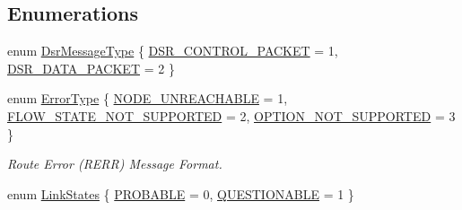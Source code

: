 \subsection*{Enumerations}
\begin{DoxyCompactItemize}
\item 
enum \hyperlink{namespacens3_1_1dsr_a7c80bcec67d78dc149a0e503014d07c5}{Dsr\+Message\+Type} \{ \hyperlink{namespacens3_1_1dsr_a7c80bcec67d78dc149a0e503014d07c5abeaa53bf31d961c221e4e377ef6022f2}{D\+S\+R\+\_\+\+C\+O\+N\+T\+R\+O\+L\+\_\+\+P\+A\+C\+K\+ET} = 1, 
\hyperlink{namespacens3_1_1dsr_a7c80bcec67d78dc149a0e503014d07c5ad29c69f5a6ad5fbb5eec5524f553e315}{D\+S\+R\+\_\+\+D\+A\+T\+A\+\_\+\+P\+A\+C\+K\+ET} = 2
 \}
\item 
enum \hyperlink{group__dsr_ga40f62a50dc031f2853e92211aad095f4}{Error\+Type} \{ \hyperlink{group__dsr_gga40f62a50dc031f2853e92211aad095f4adf3df5290f2b4d470e5ea842c44b32e5}{N\+O\+D\+E\+\_\+\+U\+N\+R\+E\+A\+C\+H\+A\+B\+LE} = 1, 
\hyperlink{group__dsr_gga40f62a50dc031f2853e92211aad095f4a7031ed624684291a4edb70f1edba2c58}{F\+L\+O\+W\+\_\+\+S\+T\+A\+T\+E\+\_\+\+N\+O\+T\+\_\+\+S\+U\+P\+P\+O\+R\+T\+ED} = 2, 
\hyperlink{group__dsr_gga40f62a50dc031f2853e92211aad095f4ae18b545e5cad7897bb7182cad1111eec}{O\+P\+T\+I\+O\+N\+\_\+\+N\+O\+T\+\_\+\+S\+U\+P\+P\+O\+R\+T\+ED} = 3
 \}\begin{DoxyCompactList}\small\item\em Route Error (R\+E\+RR) Message Format. \end{DoxyCompactList}
\item 
enum \hyperlink{namespacens3_1_1dsr_ac9e5787558472a1653f08327f988425f}{Link\+States} \{ \hyperlink{namespacens3_1_1dsr_ac9e5787558472a1653f08327f988425fa0cc42d723936d3ceefcd3cb345b7dcba}{P\+R\+O\+B\+A\+B\+LE} = 0, 
\hyperlink{namespacens3_1_1dsr_ac9e5787558472a1653f08327f988425faf16c354be3f23d4b7cd6f34e46b23327}{Q\+U\+E\+S\+T\+I\+O\+N\+A\+B\+LE} = 1
 \}
\end{DoxyCompactItemize}
